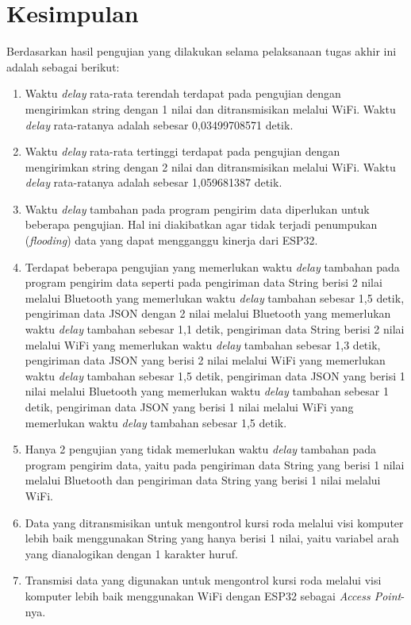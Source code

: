 \section{Kesimpulan}
\label{sec:kesimpulan}

Berdasarkan hasil pengujian yang dilakukan selama pelaksanaan tugas akhir ini adalah sebagai berikut:

\begin{enumerate}[nolistsep]

  \item Waktu \emph{delay} rata-rata terendah terdapat pada pengujian dengan mengirimkan string dengan 1 nilai dan ditransmisikan melalui WiFi. Waktu \emph{delay} rata-ratanya adalah sebesar 0,03499708571 detik.

  \item Waktu \emph{delay} rata-rata tertinggi terdapat pada pengujian dengan mengirimkan string dengan 2 nilai dan ditransmisikan melalui WiFi. Waktu \emph{delay} rata-ratanya adalah sebesar 1,059681387 detik.
  
  \item Waktu \emph{delay} tambahan pada program pengirim data diperlukan untuk beberapa pengujian. Hal ini diakibatkan agar tidak terjadi penumpukan (\emph{flooding}) data yang dapat mengganggu kinerja dari ESP32.

  \item Terdapat beberapa pengujian yang memerlukan waktu \emph{delay} tambahan pada program pengirim data seperti pada pengiriman data String berisi 2 nilai melalui Bluetooth yang memerlukan waktu \emph{delay} tambahan sebesar 1,5 detik, pengiriman data JSON dengan 2 nilai melalui Bluetooth yang memerlukan waktu \emph{delay} tambahan sebesar 1,1 detik, pengiriman data String berisi 2 nilai melalui WiFi yang memerlukan waktu \emph{delay} tambahan sebesar 1,3 detik, pengiriman data JSON yang berisi 2 nilai melalui WiFi yang memerlukan waktu \emph{delay} tambahan sebesar 1,5 detik, pengiriman data JSON yang berisi 1 nilai melalui Bluetooth yang memerlukan waktu \emph{delay} tambahan sebesar 1 detik, pengiriman data JSON yang berisi 1 nilai melalui WiFi yang memerlukan waktu \emph{delay} tambahan sebesar 1,5 detik.
  
  \item Hanya 2 pengujian yang tidak memerlukan waktu \emph{delay} tambahan pada program pengirim data, yaitu pada pengiriman data String yang berisi 1 nilai melalui Bluetooth dan pengiriman data String yang berisi 1 nilai melalui WiFi. 
  
  \item Data yang ditransmisikan untuk mengontrol kursi roda melalui visi komputer lebih baik menggunakan String yang hanya berisi 1 nilai, yaitu variabel arah yang dianalogikan dengan 1 karakter huruf. 
  
  \item Transmisi data yang digunakan untuk mengontrol kursi roda melalui visi komputer lebih baik menggunakan WiFi dengan ESP32 sebagai \emph{Access Point}-nya.

\end{enumerate}

